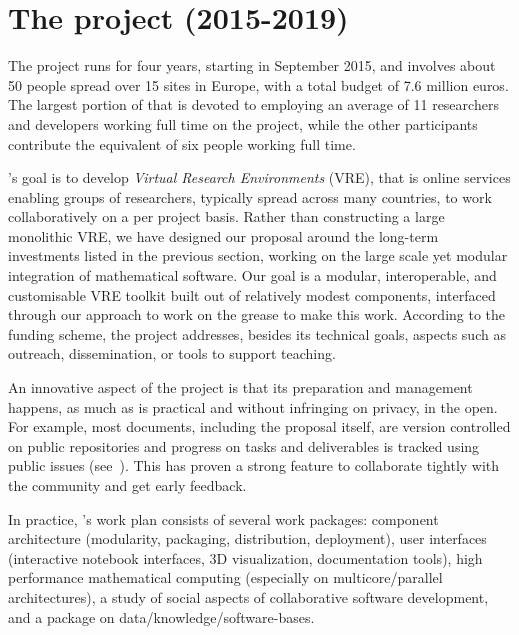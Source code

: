 \section{The \ODK project (2015-2019)}\label{sec:odk}

The \ODK project runs for four years, starting in September 2015, and
involves about 50 people spread over 15 sites in Europe, with a total
budget of 7.6 million euros. The largest portion of that is devoted to
employing an average of 11 researchers and developers working full
time on the project, while the other participants contribute the
equivalent of six people working full time.

\ODK's goal is to develop \emph{Virtual Research Environments}
(VRE), that is online services enabling groups of researchers,
typically spread across many countries, to work collaboratively on a per project
basis. Rather than constructing a large monolithic VRE, we have
designed our proposal around the long-term investments listed in the
previous section, working on the large scale yet modular integration
of mathematical software. Our goal is a modular, interoperable,
and customisable VRE toolkit built out of relatively modest
components, interfaced through our approach to work on the grease to
make this work.
According to the funding scheme, the project addresses, besides
its technical goals, aspects such as outreach, dissemination, or tools
to support teaching.

An innovative aspect of the \ODK project is that its preparation and management happens,
as much as is practical and without infringing on privacy, in the open. For example, most
documents, including the proposal itself, are version controlled on public repositories
and progress on tasks and deliverables is tracked using public issues
(see~\cite{OpenDreamKit:on}). This has proven a strong feature to collaborate tightly with
the community and get early feedback.

In practice, \ODK's work plan consists of several work packages: component architecture
(modularity, packaging, distribution, deployment), user interfaces (\Jupyter interactive
notebook interfaces, 3D visualization, documentation tools), high performance mathematical
computing (especially on multicore/parallel architectures), a study of social aspects of
collaborative software development, and a package on data/knowledge/software-bases.

